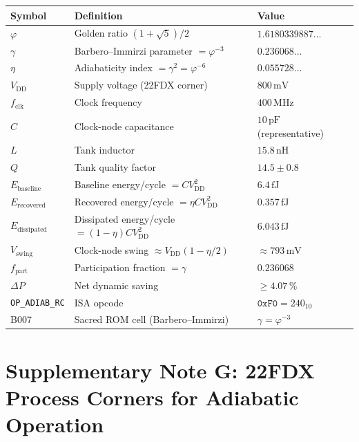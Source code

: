 \begin{center}
\begin{tabular}{lll}
\hline
Symbol & Definition & Value \\
\hline
$\varphi$ & Golden ratio $(1+\sqrt{5})/2$ & $1.6180339887\ldots$ \\
$\gamma$ & Barbero--Immirzi parameter $= \varphi^{-3}$ & $0.236068\ldots$ \\
$\eta$ & Adiabaticity index $= \gamma^{2} = \varphi^{-6}$ & $0.055728\ldots$ \\
$V_{\mathrm{DD}}$ & Supply voltage (22FDX corner) & $800\,\text{mV}$ \\
$f_{\mathrm{clk}}$ & Clock frequency & $400\,\text{MHz}$ \\
$C$ & Clock-node capacitance & $10\,\text{pF}$ (representative) \\
$L$ & Tank inductor & $15.8\,\text{nH}$ \\
$Q$ & Tank quality factor & $14.5 \pm 0.8$ \\
$E_{\mathrm{baseline}}$ & Baseline energy/cycle $= C V_{\mathrm{DD}}^{2}$ & $6.4\,\text{fJ}$ \\
$E_{\mathrm{recovered}}$ & Recovered energy/cycle $= \eta C V_{\mathrm{DD}}^{2}$ & $0.357\,\text{fJ}$ \\
$E_{\mathrm{dissipated}}$ & Dissipated energy/cycle $= (1-\eta) C V_{\mathrm{DD}}^{2}$ & $6.043\,\text{fJ}$ \\
$V_{\mathrm{swing}}$ & Clock-node swing $\approx V_{\mathrm{DD}}(1-\eta/2)$ & $\approx 793\,\text{mV}$ \\
$f_{\mathrm{part}}$ & Participation fraction $= \gamma$ & $0.236068$ \\
$\Delta P$ & Net dynamic saving & $\geq 4.07\,\%$ \\
\texttt{OP\_ADIAB\_RC} & ISA opcode & $\texttt{0xF0} = 240_{10}$ \\
B007 & Sacred ROM cell (Barbero--Immirzi) & $\gamma = \varphi^{-3}$ \\
\hline
\end{tabular}
\end{center}


\section*{Supplementary Note G: 22FDX Process Corners for Adiabatic Operation}
\label{sec:supp-g-w46}

